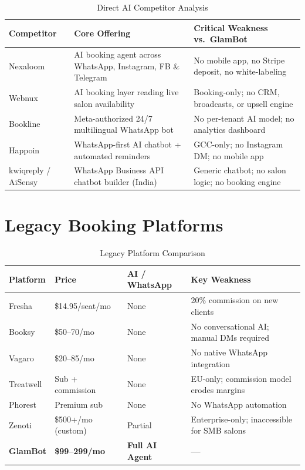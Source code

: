 \documentclass[11pt,a4paper]{report}
\begin{document}
\begin{table}[h]
\centering
\renewcommand{\arraystretch}{1.4}
\begin{tabularx}{\textwidth}{@{} l X X @{}}
\toprule
\textbf{Competitor} & \textbf{Core Offering} & \textbf{Critical Weakness vs.\ GlamBot} \\
\midrule
Nexaloom & AI booking agent across WhatsApp, Instagram, FB \& Telegram & No mobile app, no Stripe deposit, no white-labeling \\
Webnux & AI booking layer reading live salon availability & Booking-only; no CRM, broadcasts, or upsell engine \\
Bookline & Meta-authorized 24/7 multilingual WhatsApp bot & No per-tenant AI model; no analytics dashboard \\
Happoin & WhatsApp-first AI chatbot + automated reminders & GCC-only; no Instagram DM; no mobile app \\
kwiqreply / AiSensy & WhatsApp Business API chatbot builder (India) & Generic chatbot; no salon logic; no booking engine \\
\bottomrule
\end{tabularx}
\caption{Direct AI Competitor Analysis}
\end{table}

\section{Legacy Booking Platforms}

\begin{table}[h]
\centering
\renewcommand{\arraystretch}{1.4}
\begin{tabularx}{\textwidth}{@{} l l l X @{}}
\toprule
\textbf{Platform} & \textbf{Price} & \textbf{AI / WhatsApp} & \textbf{Key Weakness} \\
\midrule
Fresha      & \$14.95/seat/mo   & None & 20\% commission on new clients \\
Booksy      & \$50--70/mo       & None & No conversational AI; manual DMs required \\
Vagaro      & \$20--85/mo       & None & No native WhatsApp integration \\
Treatwell   & Sub + commission  & None & EU-only; commission model erodes margins \\
Phorest     & Premium sub       & None & No WhatsApp automation \\
Zenoti      & \$500+/mo (custom)& Partial & Enterprise-only; inaccessible for SMB salons \\
\textbf{GlamBot} & \textbf{\$99--299/mo} & \textbf{Full AI Agent} & \textbf{---} \\
\bottomrule
\end{tabularx}
\caption{Legacy Platform Comparison}
\end{table}
\end{document}
